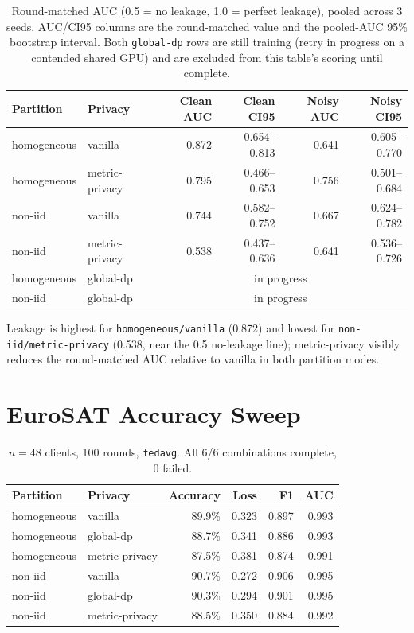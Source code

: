 \documentclass[11pt]{article}
\newcommand{\code}[1]{\texttt{#1}}
\begin{document}
\begin{table}[h!]
\centering
\begin{tabular}{llrrrr}
\toprule
Partition & Privacy & Clean AUC & Clean CI95 & Noisy AUC & Noisy CI95 \\
\midrule
homogeneous & vanilla & 0.872 & 0.654--0.813 & 0.641 & 0.605--0.770 \\
homogeneous & metric-privacy & 0.795 & 0.466--0.653 & 0.756 & 0.501--0.684 \\
non-iid & vanilla & 0.744 & 0.582--0.752 & 0.667 & 0.624--0.782 \\
non-iid & metric-privacy & 0.538 & 0.437--0.636 & 0.641 & 0.536--0.726 \\
homogeneous & global-dp & \multicolumn{4}{c}{in progress} \\
non-iid & global-dp & \multicolumn{4}{c}{in progress} \\
\bottomrule
\end{tabular}
\caption*{Round-matched AUC (0.5 = no leakage, 1.0 = perfect leakage), pooled across 3 seeds.
AUC/CI95 columns are the round-matched value and the pooled-AUC 95\% bootstrap interval. Both
\code{global-dp} rows are still training (retry in progress on a contended shared GPU) and are
excluded from this table's scoring until complete.}
\end{table}

\noindent
Leakage is highest for \code{homogeneous/vanilla} (0.872) and lowest for
\code{non-iid/metric-privacy} (0.538, near the 0.5 no-leakage line); metric-privacy visibly
reduces the round-matched AUC relative to vanilla in both partition modes.

\section*{EuroSAT Accuracy Sweep}

\begin{table}[h!]
\centering
\begin{tabular}{llrrrr}
\toprule
Partition & Privacy & Accuracy & Loss & F1 & AUC \\
\midrule
homogeneous & vanilla & 89.9\% & 0.323 & 0.897 & 0.993 \\
homogeneous & global-dp & 88.7\% & 0.341 & 0.886 & 0.993 \\
homogeneous & metric-privacy & 87.5\% & 0.381 & 0.874 & 0.991 \\
non-iid & vanilla & 90.7\% & 0.272 & 0.906 & 0.995 \\
non-iid & global-dp & 90.3\% & 0.294 & 0.901 & 0.995 \\
non-iid & metric-privacy & 88.5\% & 0.350 & 0.884 & 0.992 \\
\bottomrule
\end{tabular}
\caption*{$n=48$ clients, 100 rounds, \code{fedavg}. All 6/6 combinations complete, 0 failed.}
\end{table}
\end{document}
